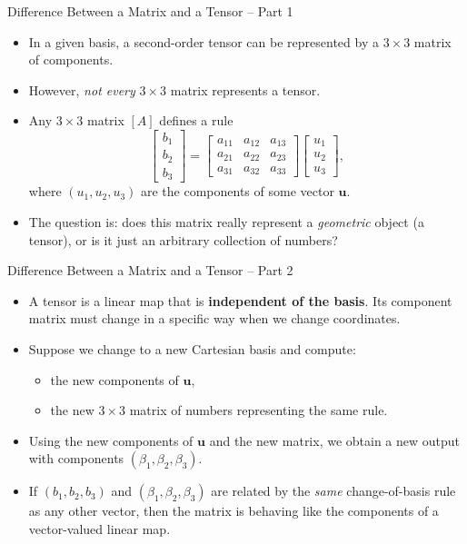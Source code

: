 \documentclass[aspectratio=169,11pt]{beamer}
\begin{document}
\begin{frame}{Difference Between a Matrix and a Tensor -- Part 1}

\begin{itemize}
    \item In a given basis, a second-order tensor can be represented by a
          $3 \times 3$ matrix of components.
    \item However, \emph{not every} $3 \times 3$ matrix represents a tensor.
    \item Any $3 \times 3$ matrix $[A]$ defines a rule
    \[
        \begin{bmatrix} b_1 \\[2pt] b_2 \\[2pt] b_3 \end{bmatrix}
        =
        \begin{bmatrix}
            a_{11} & a_{12} & a_{13} \\
            a_{21} & a_{22} & a_{23} \\
            a_{31} & a_{32} & a_{33}
        \end{bmatrix}
        \begin{bmatrix} u_1 \\[2pt] u_2 \\[2pt] u_3 \end{bmatrix},
    \]
    where $(u_1,u_2,u_3)$ are the components of some vector $\mathbf{u}$.
    \item The question is: does this matrix really represent a
          \emph{geometric} object (a tensor), or is it just an arbitrary
          collection of numbers?
\end{itemize}

\end{frame}

\begin{frame}{Difference Between a Matrix and a Tensor -- Part 2}

\begin{itemize}
    \item A tensor is a linear map that is \textbf{independent of the basis}.
          Its component matrix must change in a specific way when we change
          coordinates.
    \item Suppose we change to a new Cartesian basis and compute:
    \begin{itemize}
        \item the new components of $\mathbf{u}$,
        \item the new $3 \times 3$ matrix of numbers representing the same rule.
    \end{itemize}
    \item Using the new components of $\mathbf{u}$ and the new matrix,
          we obtain a new output with components $(\beta_1,\beta_2,\beta_3)$.
    \item If $(b_1,b_2,b_3)$ and $(\beta_1,\beta_2,\beta_3)$ are related by the
          \emph{same} change-of-basis rule as any other vector, then the matrix
          is behaving like the components of a vector-valued linear map.
\end{itemize}

\end{frame}
\end{document}
